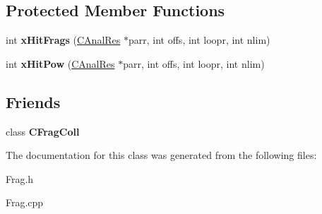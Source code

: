 \subsection*{Protected Member Functions}
\begin{DoxyCompactItemize}
\item 
\hypertarget{class_c_frag_a7035d1c888e8ee8e13d709bb31730162}{int {\bfseries x\-Hit\-Frags} (\hyperlink{class_c_anal_res}{C\-Anal\-Res} $\ast$parr, int offs, int loopr, int nlim)}\label{class_c_frag_a7035d1c888e8ee8e13d709bb31730162}

\item 
\hypertarget{class_c_frag_a2e0a2f30900d784773d3a48a86f01835}{int {\bfseries x\-Hit\-Pow} (\hyperlink{class_c_anal_res}{C\-Anal\-Res} $\ast$parr, int offs, int loopr, int nlim)}\label{class_c_frag_a2e0a2f30900d784773d3a48a86f01835}

\end{DoxyCompactItemize}
\subsection*{Friends}
\begin{DoxyCompactItemize}
\item 
\hypertarget{class_c_frag_a52befd95385c4e489a727da912ffe4a4}{class {\bfseries C\-Frag\-Coll}}\label{class_c_frag_a52befd95385c4e489a727da912ffe4a4}

\end{DoxyCompactItemize}


The documentation for this class was generated from the following files\-:\begin{DoxyCompactItemize}
\item 
Frag.\-h\item 
Frag.\-cpp\end{DoxyCompactItemize}
